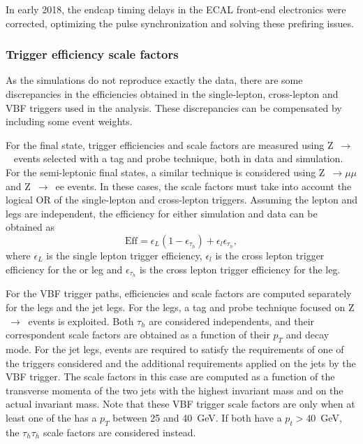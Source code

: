 \documentclass[../main.tex]{subfiles}
\begin{document}
In early 2018, the endcap timing delays in the ECAL front-end electronics were corrected, optimizing the pulse synchronization and solving these prefiring issues.

\subsubsection*{Trigger efficiency scale factors}
\label{hh:sec:trigger_sf}

As the simulations do not reproduce exactly the data, there are some discrepancies in the efficiencies obtained in the single-lepton, cross-lepton and VBF triggers used in the analysis. These discrepancies can be compensated by including some event weights.

For the \tauh\tauh{} final state, trigger efficiencies and scale factors are measured using Z~$\to$~\taumu\tauh{} events selected with a tag and probe technique, both in data and simulation. For the semi-leptonic final states, a similar technique is considered using Z~$\to\mu\mu$ and Z~$\to$~ee events. In these cases, the scale factors must take into account the logical OR of the single-lepton and cross-lepton triggers. Assuming the lepton and \tauh{} legs are independent, the efficiency for either simulation and data can be obtained as
\begin{equation}
\text{Eff} = \epsilon_L(1-\epsilon_{\tau_h}) +  \epsilon_l\epsilon_{\tau_h},
\end{equation}
where $\epsilon_L$ is the single lepton trigger efficiency, $\epsilon_l$ is the cross lepton trigger efficiency for the \taue{} or \taumu{} leg and $\epsilon_{\tau_h}$ is the cross lepton trigger efficiency for the \tauh{} leg.

For the VBF trigger paths, efficiencies and scale factors are computed separately for the \tauh{} legs and the jet legs. For the \tauh{} legs, a tag and probe technique focused on Z$~\to~$\taumu\tauh{} events is exploited. Both $\tau_h$ are considered independents, and their correspondent scale factors are obtained as a function of their $p_T$ and decay mode. For the jet legs, events are required to satisfy the requirements of one of the \tauh\tauh{} triggers considered and the additional requirements applied on the jets by the VBF trigger. The scale factors in this case are computed as a function of the transverse momenta of the two jets with the highest invariant mass and on the actual invariant mass. Note that these VBF trigger scale factors are only when at least one of the \tauh{} has a $p_T$ between 25 and 40~GeV. If both \tauh{} have a $p_t>40$~GeV, the $\tau_h\tau_h$ scale factors are considered instead.
\end{document}
